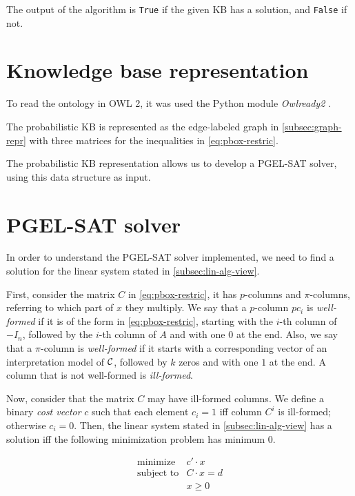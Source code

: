 The output of the algorithm is \texttt{True} if the given KB has a solution, and \texttt{False} if not.


\section{Knowledge base representation}
To read the ontology in OWL 2, it was used the Python module \textit{Owlready2} \citep{lamy2017owlready}.


The probabilistic KB is represented as the edge-labeled graph in \autoref{subsec:graph-repr} with three matrices for the inequalities in \autoref{eq:pbox-restric}.


The probabilistic KB representation allows us to develop a PGEL-SAT solver, using this data structure as input.

\section{PGEL-SAT solver}
\label{sec:pgelsatsolver}

In order to understand the PGEL-SAT solver implemented, we need to find a solution for the linear system stated in \autoref{subsec:lin-alg-view}.

First, consider the matrix $C$ in \autoref{eq:pbox-restric}, it has $p$-columns and $\pi$-columns, referring to which part of $x$ they multiply. We say that a $p$-column $pc_i$ is \emph{well-formed} if it is of the form in \autoref{eq:pbox-restric}, starting with the $i$-th column of $-I_n$, followed by the $i$-th column of $A$ and with one $0$ at the end. Also, we say that a $\pi$-column is \emph{well-formed} if it starts with a corresponding vector of an interpretation model of $\mathcal{C}$, followed by $k$ zeros and with one $1$ at the end. A column that is not well-formed is \emph{ill-formed}.

Now, consider that the matrix $C$ may have ill-formed columns. We define a binary \emph{cost vector} $c$ such that each element $c_i = 1$ iff column $C^i$ is ill-formed; otherwise $c_i = 0$. Then, the linear system stated in \autoref{subsec:lin-alg-view} has a solution iff the following minimization problem has minimum 0.

\begin{equation}
	\label{eq:linprog}
	\begin{array}{ll}
		\text{minimize}   & c' \cdot x    \\
		\text{subject to} & C \cdot x = d \\
		                  & x \geq 0
	\end{array}
\end{equation}

